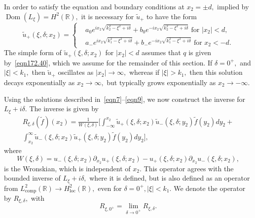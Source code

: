 \documentclass[11pt]{article}
\newcommand\loc{\operatorname{loc}}
\newcommand\comp{\operatorname{comp}}
\newcommand\Dom{\operatorname{Dom}}
\newcommand\tu{\widetilde u}
\newcommand\tf{\tilde{f}}
\newcommand\bbR{\mathbb R}
\newcommand\pa{\partial}
\theoremstyle{definition}
\theoremstyle{remark}
\begin{document}
In order to satisfy the equation and boundary conditions at $x_2=\pm
d,$ implied by $\Dom(L_{\xi})=H^2(\bbR),$ it is necessary for $\tu_+$
to have the form
\begin{equation}\label{eqn9}
  \tu_+(\xi,\delta;x_2)=
  \begin{cases}
    &a_0e^{ ix_2\sqrt{k_2^2-\xi^2+i\delta}}+b_0e^{
      -ix_2\sqrt{k^2_2-\xi^2+i\delta}}\text{ for }|x_2|<d,\\
    &a_-e^{ ix_2\sqrt{k_1^2-\xi^2+i\delta}}+b_-e^{
      -ix_2\sqrt{k^2_1-\xi^2+i\delta}}\text{ for }x_2<-d.
  \end{cases}
\end{equation}
The simple form of $\tu_+(\xi,\delta;x_2)$ for $|x_2|<d$ assumes that
$q$ is given by~\eqref{eqn172.40}, which we assume for the remainder
of this section.  If $\delta=0^+,$ and $|\xi|<k_1,$ then $\tu_+$
oscillates as $|x_2|\to \infty,$ whereas if $|\xi|>k_1,$ then this
solution decays exponentially as $x_2\to\infty,$ but typically grows
exponentially as $x_2\to-\infty.$



Using the solutions described in~\eqref{eqn7}--\eqref{eqn9}, we now
construct the inverse for $L_{\xi}+i\delta.$  The  inverse is given by
\begin{multline}\label{eqn18.02}
  R_{\xi,\delta}(\tf)(x_2)=\frac{1}{W(\xi,\delta)}
  \Bigg[\int_{-\infty}^{x_2}\tu_+(\xi,\delta;x_2)\tu_-(\xi,\delta;y_2)\tf(y_2)dy_2+\\
    \int_{x_2}^{\infty}\tu_-(\xi,\delta;x_2)\tu_+(\xi,\delta;y_2)\tf(y_2)dy_2\Bigg],
\end{multline}
where
\begin{equation}\label{eqn48.51}
  W(\xi,\delta)=u_-(\xi,\delta;x_2)\pa_{x_2}u_+(\xi,\delta;x_2)-u_+(\xi,\delta;x_2)\pa_{x_2}u_-(\xi,\delta;x_2),
\end{equation}
is the Wronskian, which is independent of $x_2.$ This operator agrees
with the bounded inverse of $L_{\xi}+i\delta,$ where it is defined,
but is also defined as an operator from $L^2_{\comp}(\bbR)\to
H^2_{\loc}(\bbR),$ even for $\delta=0^+,|\xi|< k_1.$ We denote the
operator by $R_{\xi,\delta},$  with
\begin{equation}
  R_{\xi,0^+}=\lim_{\delta\to 0^+}R_{\xi,\delta}.
\end{equation}
\end{document}
